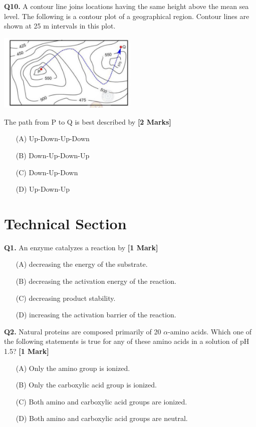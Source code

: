 \documentclass[11pt]{article}
\newcommand{\questiona}[2]{
    \noindent\textbf{Q#2.} #1 \hfill \textbf{[1 Mark]}
}
\newcommand{\questionb}[2]{
    \noindent\textbf{Q#2.} #1 \hfill \textbf{[2 Marks]}
}
\begin{document}
\questionb{A contour line joins locations having the same height above the mean sea level. The following is a contour plot of a geographical region. Contour lines are shown at 25 m intervals in this plot.

\begin{center}
\includegraphics[width=0.5\textwidth]{figures/10.png}
\end{center}

The path from P to Q is best described by}{10}
\begin{enumerate}
    \item[(A)] Up-Down-Up-Down
    \item[(B)] Down-Up-Down-Up  
    \item[(C)] Down-Up-Down
    \item[(D)] Up-Down-Up
\end{enumerate}

\vspace{1 cm}

\section*{Technical Section}

\questiona{An enzyme catalyzes a reaction by}{1}
\begin{enumerate}
    \item[(A)] decreasing the energy of the substrate.
    \item[(B)] decreasing the activation energy of the reaction.  
    \item[(C)] decreasing product stability.
    \item[(D)] increasing the activation barrier of the reaction.
\end{enumerate}

\vspace{0.5cm}

\questiona{Natural proteins are composed primarily of 20 $\alpha$-amino acids. Which one of the following statements is true for any of these amino acids in a solution of pH 1.5?}{2}
\begin{enumerate}
    \item[(A)] Only the amino group is ionized.
    \item[(B)] Only the carboxylic acid group is ionized.  
    \item[(C)] Both amino and carboxylic acid groups are ionized.
    \item[(D)] Both amino and carboxylic acid groups are neutral.
\end{enumerate}
\end{document}
